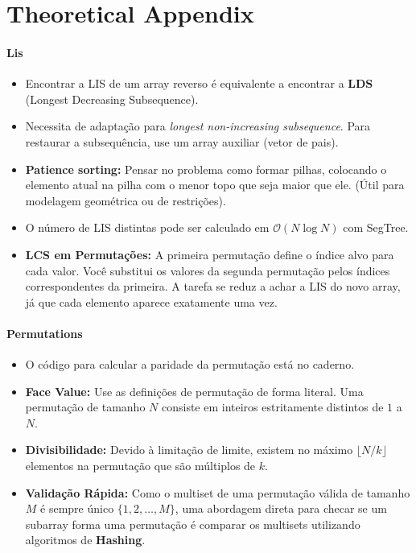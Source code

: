 \documentclass[10pt,a4paper,twocolumn]{article}
\begin{document}
\part{Theoretical Appendix}
\setcounter{section}{0}
\setcounter{subsection}{0}
\begingroup
\renewcommand{\thesubsection}{\arabic{subsection}}
\subsection{Lis}
\begin{itemize}
    \item Encontrar a LIS de um array reverso é equivalente a encontrar a \textbf{LDS} (Longest Decreasing Subsequence).
    \item Necessita de adaptação para \textit{longest non-increasing subsequence}. Para restaurar a subsequência, use um array auxiliar (vetor de pais).
    \item \textbf{Patience sorting:} Pensar no problema como formar pilhas, colocando o elemento atual na pilha com o menor topo que seja maior que ele. (Útil para modelagem geométrica ou de restrições).
    \item O número de LIS distintas pode ser calculado em $\mathcal{O}(N \log N)$ com SegTree.
    \item \textbf{LCS em Permutações:} A primeira permutação define o índice alvo para cada valor. Você substitui os valores da segunda permutação pelos índices correspondentes da primeira. A tarefa se reduz a achar a LIS do novo array, já que cada elemento aparece exatamente uma vez.
\end{itemize}

\subsection{Permutations}
\begin{itemize}
    \item O código para calcular a paridade da permutação está no caderno.
    \item \textbf{Face Value:} Use as definições de permutação de forma literal. Uma permutação de tamanho $N$ consiste em inteiros estritamente distintos de $1$ a $N$.
    \item \textbf{Divisibilidade:} Devido à limitação de limite, existem no máximo $\lfloor N/k \rfloor$ elementos na permutação que são múltiplos de $k$.
    \item \textbf{Validação Rápida:} Como o multiset de uma permutação válida de tamanho $M$ é sempre único $\{1, 2, \dots, M\}$, uma abordagem direta para checar se um subarray forma uma permutação é comparar os multisets utilizando algoritmos de \textbf{Hashing}.
\end{itemize}
\end{document}
